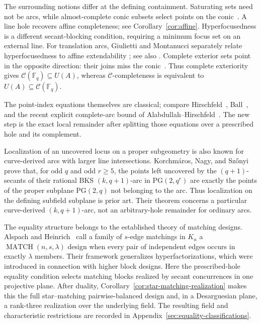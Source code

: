 \documentclass[11pt]{article}
\theoremstyle{definition}
\theoremstyle{remark}
\newcommand{\PG}{\mathrm{PG}}
\newcommand{\F}{\mathbb{F}}
\newcommand{\cC}{\mathcal{C}}
\begin{document}
The surrounding notions differ at the defining containment.  Saturating
sets need not be arcs, while almost-complete conic subsets select points
on the conic~\cite{BartoliEtAl2018}.  A line hole recovers affine
completeness; see Corollary~\ref{cor:affine}.  Hyperfocusedness is a
different secant-blocking condition, requiring a minimum focus set on an
external line.  For translation arcs, Giulietti and Montanucci separately
relate hyperfocusedness to affine extendability
\cite[Definition~2 and Proposition~3.4]{GiuliettiMontanucci2006}; see also
\cite{NgWild2001,KorchmarosSzonyi2008}.  Complete exterior sets point in
the opposite direction: their joins miss the
conic~\cite[p.~143]{BlokhuisSeressWilbrink1992}.
Thus complete exteriority gives
\(\cC(\F_q)\subseteq U(A)\), whereas \(\cC\)-completeness is equivalent to
\(U(A)\subseteq\cC(\F_q)\).

The point-index equations themselves are classical; compare
Hirschfeld~\cite[Chapter~9]{Hirschfeld1998},
Ball~\cite[p.~34]{Ball1997}, and the
recent explicit complete-arc bound of
Alabdullah--Hirschfeld~\cite{AlabdullahHirschfeld2019}.  The new step is
the exact local remainder after splitting those equations over a
prescribed hole and its complement.

Localization of an uncovered locus on a proper subgeometry is also known
for curve-derived arcs with larger line intersections.  Korchm\'aros,
Nagy, and Sz\H{o}nyi~\cite[Theorem~7.5]{KorchmarosNagySzonyi2024} prove
that, for odd $q$ and odd $r\ge5$, the points left uncovered by the
$(q+1)$-secants of their rational BKS $(k,q+1)$-arc in
\(\PG(2,q^r)\) are exactly the points of the proper subplane
\(\PG(2,q)\) not belonging to the arc.  Thus localization on the defining
subfield subplane is prior art.  Their theorem concerns a particular
curve-derived $(k,q+1)$-arc, not an arbitrary-hole remainder for ordinary
arcs.

The equality structure belongs to the established theory of matching
designs.  Alspach and Heinrich~\cite{AlspachHeinrich1990} call a family of
$s$-edge matchings in $K_n$ a $\operatorname{MATCH}(n,s,\lambda)$ design
when every pair of independent edges occurs in exactly $\lambda$ members.
Their framework generalizes hyperfactorizations, which were introduced in
connection with higher block designs.  Here the prescribed-hole equality
condition selects matching blocks realized by secant concurrences in one
projective plane.  After duality,
Corollary~\ref{cor:star-matching-realization} makes this the full
star--matching pairwise-balanced design and, in a Desarguesian plane, a
rank-three realization over the underlying field.  The resulting field and
characteristic restrictions are recorded in
Appendix~\ref{sec:equality-classifications}.
\end{document}
